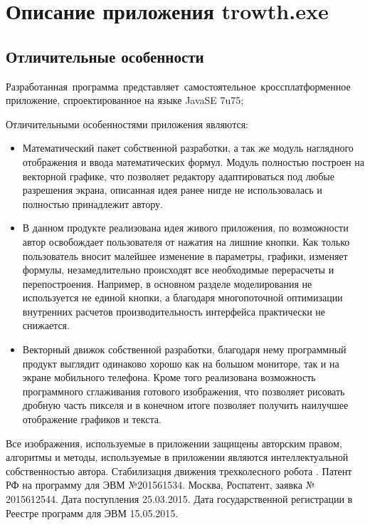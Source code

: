 \newpage
\appendix
\renewcommand{\thechapter}{\Asbuk{chapter}}
\chapter{Описание приложения trowth.exe} 
\section{Отличительные особенности} \label{app1start}

Разработанная~программа~представляет~самостоятельное~кроссплатформенное приложение, спроектированное на языке JavaSE 7u75;	

Отличительными особенностями приложения являются:
\begin{itemize}
\item{Математический пакет собственной разработки, а так же модуль наглядного отображения и ввода  математических формул. Модуль полностью построен на векторной графике, что позволяет редактору адаптироваться под любые разрешения экрана, описанная идея ранее нигде не использовалась и полностью принадлежит автору.}
\item{В данном продукте реализована идея живого приложения, по возможности автор освобождает пользователя от нажатия на лишние кнопки. Как только пользователь вносит малейшее изменение в параметры, графики, изменяет формулы, незамедлительно происходят все необходимые перерасчеты и перепостроения. Например, в основном разделе моделирования не используется не единой кнопки, а благодаря многопоточной оптимизации внутренних расчетов производительность интерфейса практически не снижается.}
\item{Векторный движок собственной разработки, благодаря нему программный продукт выглядит одинаково хорошо как на большом мониторе, так и на экране мобильного телефона. Кроме того реализована возможность программного сглаживания готового изображения, что позволяет рисовать дробную часть пикселя и в конечном итоге позволяет получить наилучшее отображение графиков и текста.}
\end{itemize}

Все изображения, используемые в приложении защищены авторским правом, алгоритмы и методы, используемые в приложении являются интеллектуальной собственностью автора. Стабилизация движения трехколесного робота . Патент РФ на программу для ЭВМ №201561534.  Москва, Роспатент, заявка № 2015612544. Дата поступления 25.03.2015.  Дата государственной регистрации в Реестре программ для ЭВМ 15.05.2015. 

